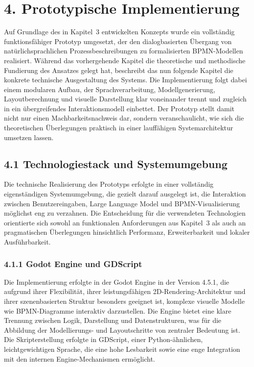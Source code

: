 \documentclass[a4paper,12pt]{scrreprt}
\begin{document}
\section*{4. Prototypische Implementierung}

Auf Grundlage des in Kapitel~3 entwickelten Konzepts wurde ein vollständig funktionsfähiger Prototyp umgesetzt, der den dialogbasierten Übergang von natürlichsprachlichen Prozessbeschreibungen zu formalisierten BPMN-Modellen realisiert. Während das vorhergehende Kapitel die theoretische und methodische Fundierung des Ansatzes gelegt hat, beschreibt das nun folgende Kapitel die konkrete technische Ausgestaltung des Systems. Die Implementierung folgt dabei einem modularen Aufbau, der Sprachverarbeitung, Modellgenerierung, Layoutberechnung und visuelle Darstellung klar voneinander trennt und zugleich in ein übergreifendes Interaktionsmodell einbettet. Der Prototyp stellt damit nicht nur einen Machbarkeitsnachweis dar, sondern veranschaulicht, wie sich die theoretischen Überlegungen praktisch in einer lauffähigen Systemarchitektur umsetzen lassen.

\subsection*{4.1 Technologiestack und Systemumgebung}

Die technische Realisierung des Prototyps erfolgte in einer vollständig eigenständigen Systemumgebung, die gezielt darauf ausgelegt ist, die Interaktion zwischen Benutzereingaben, Large Language Model und BPMN-Visualisierung möglichst eng zu verzahnen. Die Entscheidung für die verwendeten Technologien orientierte sich sowohl an funktionalen Anforderungen aus Kapitel~3 als auch an pragmatischen Überlegungen hinsichtlich Performanz, Erweiterbarkeit und lokaler Ausführbarkeit.

\subsubsection*{4.1.1 Godot Engine und GDScript}

Die Implementierung erfolgte in der Godot Engine in der Version 4.5.1, die aufgrund ihrer Flexibilität, ihrer leistungsfähigen 2D-Rendering-Architektur und ihrer szenenbasierten Struktur besonders geeignet ist, komplexe visuelle Modelle wie BPMN-Diagramme interaktiv darzustellen. Die Engine bietet eine klare Trennung zwischen Logik, Darstellung und Datenstrukturen, was für die Abbildung der Modellierungs- und Layoutschritte von zentraler Bedeutung ist. Die Skripterstellung erfolgte in GDScript, einer Python-ähnlichen, leichtgewichtigen Sprache, die eine hohe Lesbarkeit sowie eine enge Integration mit den internen Engine-Mechanismen ermöglicht. 
\end{document}
